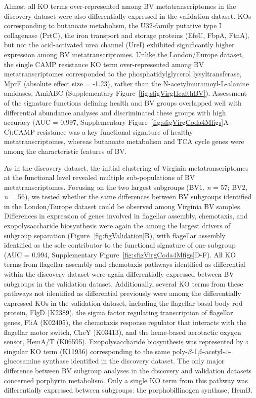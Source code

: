 \documentclass[sn-mathphys,Numbered]{sn-jnl}%
\begin{document}
Almost all KO terms over-represented among BV metatranscriptomes in the discovery dataset were also differentially expressed in the validation dataset. KOs corresponding to butanoate metabolism, the U32-family putative type I collagenase (PrtC), the iron transport and storage proteins (EfeU, FbpA, FtnA), but not the acid-activated urea channel (UreI) exhibited significantly higher expression among BV metatranscriptomes. Unlike the London/Europe dataset, the single CAMP resistance KO term over-represented among BV metatranscriptomes corresponded to the phosphatidylglycerol lysyltransferase, MprF (absolute effect size = -1.23), rather than the N-acetylmuramoyl-L-alanine amidases, AmiABC (Supplementary Figure~\ref{fig:sfigVirgHealthBV}). Assessment of the signature functions defining health and BV groups overlapped well with differential abundance analyses and discriminated these groups with high accuracy (AUC = 0.997, Supplementary Figure~\ref{fig:sfigVirgCoda4Mfigs}A-C):CAMP resistance was a key functional signature of healthy metatranscriptomes, whereas butanoate metabolism and TCA cycle genes were among the characteristic features of BV.

As in the discovery dataset, the initial clustering of Virginia metatranscriptomes at the functional level revealed multiple sub-populations of BV metatranscriptomes. Focusing on the two largest subgroups (BV1, \textit{n} = 57; BV2, \textit{n} = 56), we tested whether the same differences between BV subgroups identified in the London/Europe dataset could be observed among Virginia BV samples. Differences in expression of genes involved in flagellar assembly, chemotaxis, and exopolysaccharide biosynthesis were again the among the largest drivers of subgroup separation (Figure~\ref{fig:figValidation}B), with flagellar assembly identified as the sole contributor to the functional signature of one subgroup (AUC = 0.994, Supplementary Figure~\ref{fig:sfigVirgCoda4Mfigs}D-F). All KO terms from flagellar assembly and chemotaxis pathways identified as differential within the discovery dataset were again differentially expressed between BV subgroups in the validation dataset. Additionally, several KO terms from these pathways not identified as differential previously were among the differentially expressed KOs in the validation dataset, including the flagellar basal body rod protein, FlgD (K2389), the sigma factor regulating transcription of flagellar genes, FliA (K02405), the chemotaxis response regulator that interacts with the flagellar motor switch, CheY (K03413), and the heme-based aerotactic oxygen sensor, HemA/T (K06595). Exopolysaccharide biosynthesis was represented by a singular KO term (K11936) corresponding to the same poly-$\beta$-1,6-acetyl-\textsc{d}-glucosamine synthase identified in the discovery dataset. The only major difference between BV subgroup analyses in the discovery and validation datasets concerned porphyrin metabolism. Only a single KO term from this pathway was differentially expressed between subgroups: the porphobillinogen synthase, HemB.
\end{document}
